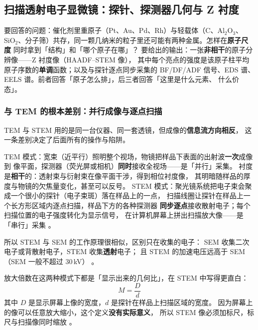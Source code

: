 \subsection{扫描透射电子显微镜：探针、探测器几何与 Z 衬度}

\begin{probout}
要回答的问题：催化剂里重原子（Pt、Au、Pd、Rh）与轻载体（C、Al$_2$O$_3$、
SiO$_2$、分子筛）共存，同一颗几纳米的粒子里还可能有两种金属。怎样在\textbf{原子尺度}
同时拿到「结构」和「哪个原子在哪」？
要给出的输出：一张\textbf{非相干}的原子分辨像——Z 衬度像（HAADF--STEM 像），
其中每个亮点的强度是该原子柱平均原子序数的\textbf{单调}函数；以及与探针逐点同步采集的
BF/DF/ADF 信号、EDS 谱、EELS 谱。前者回答「原子怎么排」，后三者回答「这里是什么元素、
什么价态」。
\end{probout}

\subsubsection{与 TEM 的根本差别：并行成像与逐点扫描}

TEM 与 STEM 用的是同一台仪器、同一套透镜，但成像的\textbf{信息流方向相反}，
这一条差别决定了后面所有的操作与陷阱。

TEM 模式：宽束（近平行）照明整个视场，物镜把样品下表面的出射波\textbf{一次}成像到
像平面，探测器（荧光屏或相机）\textbf{同时}接收全视场——是「并行」采集。
衬度是\textbf{相干}的：透射束与衍射束在像平面干涉，得到相位衬度像，
其明暗随样品的厚度与物镜的欠焦量变化，甚至可以反号。
STEM 模式：聚光镜系统把电子束会聚成一个很小的探针（电子束斑）落在样品上的一点，
扫描线圈让探针在样品上一个长方形区域内逐点扫描，样品下方的各种探测器
\textbf{同步逐点}接收散射电子；每个扫描位置的电子强度转化为显示信号，
在计算机屏幕上拼出扫描放大像——是「串行」采集
。

所以 STEM 与 SEM 的工作原理很相似，区别只在收集的电子：
SEM 收集二次电子或背散射电子，STEM 收集\textbf{透射}电子；
且 STEM 的加速电压远高于 SEM（SEM 一般不超过 30\,kV）
。

放大倍数在这两种模式下都是「显示出来的几何比」，在 STEM 中写得更直白：
\begin{equation}
M=\frac{D}{d}
\label{eq:ch02b-mag}
\end{equation}
其中 $D$ 是显示屏幕上像的宽度，$d$ 是探针在样品上扫描区域的宽度。
因为屏幕上的像可以任意放大缩小，这个定义\textbf{没有实际意义}，
所以 STEM 像必须加标尺，标尺与扫描像同时缩放
。

